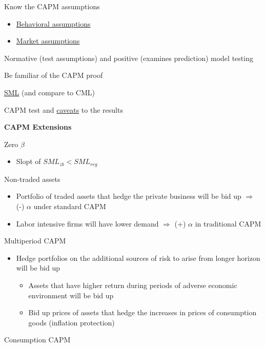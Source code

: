 \documentclass[]{book}
\providecommand{\tightlist}{%
  \setlength{\itemsep}{0pt}\setlength{\parskip}{0pt}}
\theoremstyle{definition}
\theoremstyle{definition}
\theoremstyle{remark}
\begin{document}
Know the CAPM assumptions

\begin{itemize}
\tightlist
\item
  \protect\hyperlink{behav-ass}{Behavioral assumptions}
\item
  \protect\hyperlink{market-ass}{Market assumptions}
\end{itemize}

Normative (test assumptions) and positive (examines prediction) model
testing

Be familiar of the CAPM proof

\protect\hyperlink{SML}{SML} (and compare to CML)

CAPM test and \protect\hyperlink{CAPM-test-caveat}{caveats} to the
results

\textbf{CAPM Extensions}

Zero \(\beta\)

\begin{itemize}
\tightlist
\item
  Slopt of \(SML_{zb} < SML_{reg}\)
\end{itemize}

Non-traded assets

\begin{itemize}
\item
  Portfolio of traded assets that hedge the private business will be bid
  up \(\Rightarrow\) (-) \(\alpha\) under standard CAPM
\item
  Labor intensive firms will have lower demand \(\Rightarrow\) (+)
  \(\alpha\) in traditional CAPM
\end{itemize}

Multiperiod CAPM

\begin{itemize}
\item
  Hedge portfolios on the additional sources of risk to arise from
  longer horizon will be bid up

  \begin{itemize}
  \tightlist
  \item
    Assets that have higher return during periods of adverse economic
    environment will be bid up
  \item
    Bid up prices of assets that hedge the increases in prices of
    consumption goods (inflation protection)
  \end{itemize}
\end{itemize}

Consumption CAPM
\end{document}
